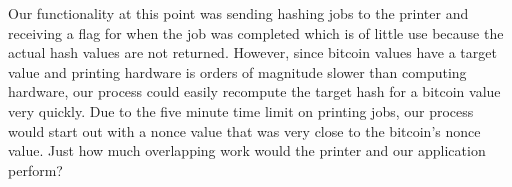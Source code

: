 Our functionality at this point was sending hashing jobs to the printer and receiving a flag for when the job was completed which is of little use because the actual hash values are not returned.
However, since bitcoin values have a target value and printing hardware is orders of magnitude slower than computing hardware, our process could easily recompute the target hash for a bitcoin value very quickly.
Due to the five minute time limit on printing jobs, our process would start out with a nonce value that was very close to the bitcoin’s nonce value.
Just how much overlapping work would the printer and our application perform?
